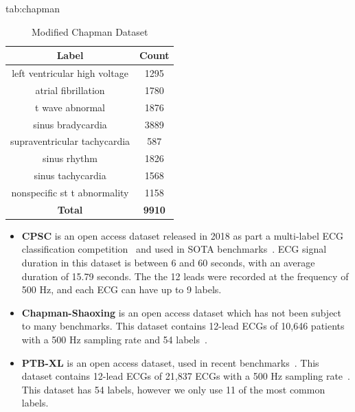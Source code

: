 \documentclass[pmlr,twocolumn]{jmlr}%
\begin{document}
\begin{table}[tbp]
\floatconts
  {tab:chapman}%
  {\caption{Modified Chapman Dataset}}%
  {
    \begin{tabular}{|c|c|}
     \hline
    Label & Count \\
     \hline
    left ventricular high voltage &  1295 \\
    atrial fibrillation           &  1780 \\
    t wave abnormal               &  1876 \\
    sinus bradycardia             &  3889 \\
    supraventricular tachycardia  &   587 \\
    sinus rhythm                  &  1826 \\
    sinus tachycardia             &  1568 \\
    nonspecific st t abnormality  &  1158 \\
     \hline
    \textbf{Total} & \textbf{9910}\\
    \hline
    \end{tabular}
  }
\end{table}

\begin{itemize}
    \item \textbf{CPSC} is an open access  dataset released in 2018 as part a multi-label ECG classification competition~\cite{liu2018open} and used in SOTA benchmarks~\cite{strodthoff2020deep}. ECG signal duration in this dataset is between 6 and 60 seconds, with an average duration of 15.79 seconds. The the 12 leads were recorded at the frequency of 500 Hz, and each ECG can have up to 9 labels.
    \item \textbf{Chapman-Shaoxing} is an open access dataset which has not been subject to many benchmarks. This dataset contains 12-lead ECGs of 10,646 patients with a 500 Hz sampling rate and 54 labels~\cite{zheng202012}.
    \item \textbf{PTB-XL} is an open access dataset, used in recent benchmarks~\cite{strodthoff2020deep}. This dataset contains 12-lead ECGs of 21,837 ECGs with a 500 Hz sampling rate~\cite{zheng202012}. This dataset has 54 labels, however we only use 11 of the most common labels. 
\end{itemize}
\end{document}
